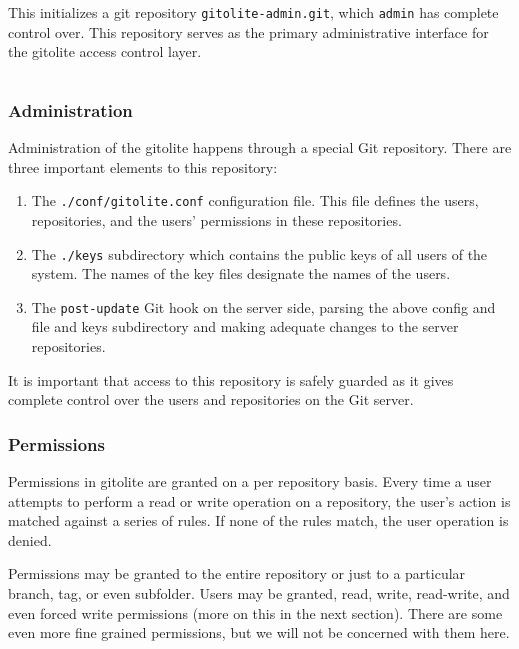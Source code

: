 This initializes a git repository \texttt{gitolite-admin.git}, which
\texttt{admin} has complete control over. This repository serves as the primary
administrative interface for the gitolite access control layer.

\begin{lstlisting}

\end{lstlisting}

\subsubsection{Administration}

Administration of the gitolite happens through a special Git repository. There
are three important elements to this repository:

\begin{enumerate}

\item The \texttt{./conf/gitolite.conf} configuration file. This file defines
the users, repositories, and the users' permissions in these repositories.

\item The \texttt{./keys} subdirectory which contains the public keys of all
users of the system. The names of the key files designate the names of the
users\cite{gitolite-com-2014d}.

\item The \texttt{post-update} Git hook on the server side, parsing the above
config and file and keys subdirectory and making adequate changes to the
server repositories.

\end{enumerate}

It is important that access to this repository is safely guarded as it gives
complete control over the users and repositories on the Git server.

\subsubsection{Permissions}

Permissions in gitolite are granted on a per repository basis. Every time a
user attempts to perform a read or write operation on a repository, the user's
action is matched against a series of rules. If none of the rules match, the
user operation is denied.

Permissions may be granted to the entire repository or just to a particular
branch, tag, or even subfolder. Users may be granted, read, write, read-write,
and even forced write permissions (more on this in the next section).  There
are some even more fine grained permissions\cite{gitolite-com-2014e}, but we
will not be concerned with them here.

